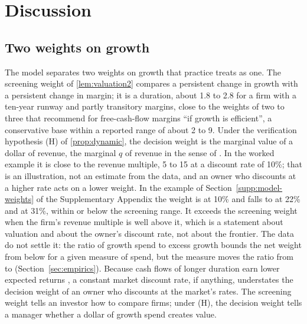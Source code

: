 \section{Discussion}\label{sec:discussion}

\subsection{Two weights on growth}
The model separates two weights on growth that practice treats as one. The screening weight of \autoref{lem:valuation2} compares a persistent change in growth with a persistent change in margin; it is a duration, about 1.8 to 2.8 for a firm with a ten-year runway and partly transitory margins, close to the weights of two to three that \citet{bessemer2024rulex} recommend for free-cash-flow margins ``if growth is efficient'', a conservative base within a reported range of about 2 to 9. Under the verification hypothesis (H) of \autoref{prop:dynamic}, the decision weight is the marginal value of a dollar of revenue, the marginal $q$ of revenue in the sense of \citet{hayashi1982tobin}. In the worked example it is close to the revenue multiple, 5 to 15 at a discount rate of 10\%; that is an illustration, not an estimate from the data, and an owner who discounts at a higher rate acts on a lower weight. In the example of Section~\ref{supp:model-weights} of the Supplementary Appendix the weight is \WeightTen{} at 10\% and falls to \WeightTwentyTwo{} at 22\% and \WeightThirtyOne{} at 31\%, within or below the screening range. It exceeds the screening weight when the firm's revenue multiple is well above it, which is a statement about valuation and about the owner's discount rate, not about the frontier. The data do not settle it: the ratio of growth spend to excess growth bounds the net weight from below for a given measure of spend, but the measure moves the ratio from \AlphaAllLo{} to \AlphaAllHi{} (Section~\ref{sec:empirics}). Because cash flows of longer duration earn lower expected returns \citep{weber2018cash,gormsen2023duration}, a constant market discount rate, if anything, understates the decision weight of an owner who discounts at the market's rates. The screening weight tells an investor how to compare firms; under (H), the decision weight tells a manager whether a dollar of growth spend creates value.

